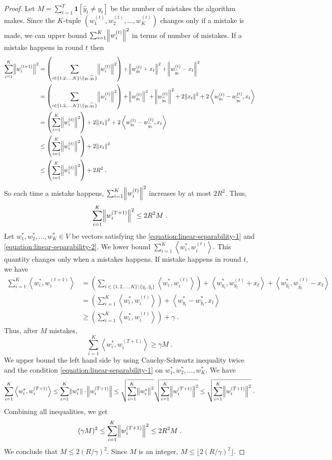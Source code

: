 \documentclass[12pt]{article}
\newcommand{\indicator}[1]{\mathbf{1}\left[#1 \right]} %
\newcommand{\ip}[2]{\left\langle #1, #2 \right\rangle} %
\begin{document}
\begin{proof}
Let $M = \sum_{t=1}^T \indicator{\widehat y_t \neq y_t}$ be the number of
mistakes the algorithm makes. Since the $K$-tuple $(w_1^{(t)}, w_2^{(t)}, \dots,
w_K^{(t)})$ changes only if a mistake is made, we can upper bound $\sum_{i=1}^K
\norm{w_i^{(t)}}^2$ in terms of number of mistakes.
If a mistake happens in round $t$ then
\begin{align*}
\sum_{i=1}^K \norm{w_i^{(t+1)}}^2
& = \left(\sum_{i \in \{1,2,\dots,K\} \setminus \{y_t, \widehat y_t\} } \norm{w_i^{(t)}}^2 \right) + \norm{w_{y_t}^{(t)} + x_t}^2 + \norm{w_{\widehat y_t}^{(t)} - x_t}^2 \\
& = \left(\sum_{i \in \{1,2,\dots,K\} \setminus \{y_t, \widehat y_t\} } \norm{w_i^{(t)}}^2 \right) + \norm{w_{y_t}^{(t)}}^2 + \norm{w_{\widehat y_t}^{(t)}}^2 + 2 \norm{x_t}^2 + 2 \ip{w_{y_t}^{(t)} - w_{\widehat y_t}^{(t)}}{x_t} \\
& = \left(\sum_{i=1}^K \norm{w_i^{(t)}}^2 \right) + 2 \norm{x_t}^2 + 2 \ip{w_{y_t}^{(t)} - w_{\widehat y_t}^{(t)}}{x_t} \\
& \le \left(\sum_{i=1}^K \norm{w_i^{(t)}}^2 \right) + 2 \norm{x_t}^2 \\
& \le \left(\sum_{i=1}^K \norm{w_i^{(t)}}^2 \right) + 2 R^2 \; .
\end{align*}
So each time a mistake happens, $\sum_{i=1}^K \norm{w_i^{(t)}}^2$ increases by at most $2R^2$. Thus,
$$
\sum_{i=1}^K \norm{w_i^{(T+1)}}^2 \le 2R^2 M \; .
$$
Let $w_1^*, w_2^*, \dots, w_K^* \in V$ be vectors satisfying the
\eqref{equation:linear-separability-1} and
\eqref{equation:linear-separability-2}. We lower bound $\sum_{i=1}^K \ip{w_i^*}{w_i^{(t)}}$. This quantity changes
only when a mistakes happens. If mistake happens in round $t$, we have
\begin{align*}
\sum_{i=1}^K \ip{w_i^*}{w_i^{(t+1)}}
& = \left( \sum_{i \in \{1,2,\dots,K\} \setminus \{y_t, \widehat y_t\}} \ip{w_i^*}{w_i^{(t)}} \right) + \ip{w_{y_t}^*}{w_{y_t}^{(t)} + x_t} + \ip{w_{\widehat y_t}^*}{w_{\widehat y_t}^{(t)} - x_t} \\
& = \left( \sum_{i=1}^K \ip{w_i^*}{w_i^{(t)}} \right) + \ip{w_{y_t}^* - w_{\widehat y_t}^*}{x_t} \\
& \ge  \left( \sum_{i=1}^K \ip{w_i^*}{w_i^{(t)}} \right) + \gamma \; .
\end{align*}
Thus, after $M$ mistakes,
$$
\sum_{i=1}^K \ip{w_i^*}{w_i^{(T+1)}} \ge \gamma M \; .
$$
We upper bound the left hand side by using Cauchy-Schwartz inequality twice and
the condition \eqref{equation:linear-separability-1} on $w_1^*, w_2^*, \dots,
w_K^*$. We have
$$
\sum_{i=1}^K \ip{w_i^*}{w_i^{(T+1)}}
\le \sum_{i=1}^K \norm{w_i^*} \cdot \norm{w_i^{(T+1)}}
\le \sqrt{\sum_{i=1}^K \norm{w_i^*}^2} \sqrt{\sum_{i=1}^K \norm{w_i^{(T+1)}}^2}
\le \sqrt{\sum_{i=1}^K \norm{w_i^{(T+1)}}^2} \; .
$$
Combining all inequalities, we get
$$
(\gamma M)^2 \le \sum_{i=1}^K \norm{w_i^{(T+1)}}^2 \le 2R^2 M \; .
$$
We conclude that $M \le 2(R/\gamma)^2$. Since $M$ is an integer, $M \le \lfloor 2(R/\gamma)^2 \rfloor$.
\end{proof}
\end{document}
